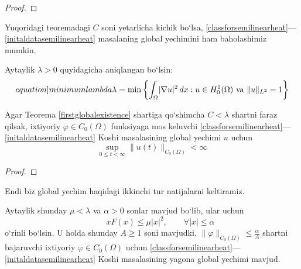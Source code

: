 \begin{proof}
    
\end{proof}

\begin{remark}
    Yuqoridagi teoremadagi $C$ soni yetarlicha kichik bo`lsa, \eqref{classforsemilinearheat}---\eqref{initaldatasemilinearheat} masalaning global yechimini ham baholashimiz mumkin.
\end{remark}

Aytaylik $\lambda>0$ quyidagicha aniqlangan bo`lsin:
\begin{equation}\label[equation]{minimumlambda}
    \lambda=\min \left\{\int_{\Omega}\lvert\nabla u\rvert^2\,dx : u\in H_0^1(\Omega) \text{ va } \lVert u\rVert _{L^2}=1 \right\}
\end{equation}
\begin{theorem}
    Agar Teorema \ref{firstglobalexistence} shartiga qo`shimcha $C<\lambda$ shartni faraz qilsak, ixtiyoriy $\varphi\in C_0(\Omega)$ funksiyaga mos keluvchi \eqref{classforsemilinearheat}---\eqref{initaldatasemilinearheat} Koshi masalasining global yechimi $u$ uchun 
    \begin{equation*}
        \sup\limits_{0\le t<\infty} \lVert u(t) \rVert _{C_0(\Omega)}<\infty
    \end{equation*} 
\end{theorem}
\begin{proof}
    
\end{proof}

Endi biz global yechim haqidagi ikkinchi tur natijalarni keltiramiz.
\begin{theorem}
    Aytaylik shunday $\mu<\lambda$ va $\alpha>0$ sonlar mavjud bo`lib, ular uchun 
    \begin{equation*}
      \qquad  x F(x)\le \mu \lvert x\rvert ^2,\qquad \forall \lvert x\rvert \le \alpha
    \end{equation*}
    o`rinli bo`lsin. U holda shunday $A\ge 1$ soni mavjudki, $\lVert \varphi \rVert _{C_0(\Omega)}\le \frac{\alpha}{A}$ shartni bajaruvchi ixtiyoriy $\varphi \in C_0(\Omega)$ uchun \eqref{classforsemilinearheat}---\eqref{initaldatasemilinearheat} Koshi masalasining yagona global yechimi mavjud.
\end{theorem}